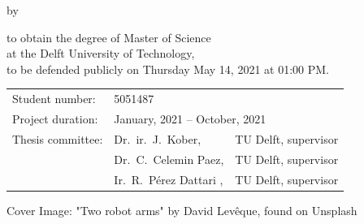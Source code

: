 \begin{titlepage}

\begin{center}

{\makeatletter
\largetitlestyle\fontsize{45}{45}\selectfont\@title
\makeatother}

{\makeatletter
\ifdefvoid{\@subtitle}{}{\titlestyle\fontsize{20}{20}\selectfont\@subtitle}
\makeatother}

\bigskip
\bigskip

by

\bigskip
\bigskip

{\makeatletter
\largetitlestyle\fontsize{25}{25}\selectfont\@author
\makeatother}

\bigskip
\bigskip

to obtain the degree of Master of Science \\
at the Delft University of Technology, \\
to be defended publicly on Thursday May 14, 2021 at 01:00 PM.

\vfill

\begin{tabular}{lll}
    Student number: & 5051487 \\
        Project duration: & \multicolumn{2}{l}{January, 2021 -- October, 2021} \\
    Thesis committee: & Dr.\ ir.\ J.\ Kober, & TU Delft, supervisor \\
        & Dr.\ C.\ Celemin Paez, & TU Delft, supervisor \\
        & Ir.\ R.\ Pérez Dattari , & TU Delft, supervisor
\end{tabular}

\vspace{1cm}
\small{Cover Image: "Two robot arms" by David Levêque, found on Unsplash}

\end{center}


\end{titlepage}
